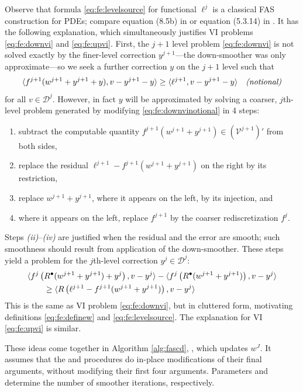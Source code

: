 \documentclass[letterpaper,final,12pt,reqno]{amsart}
\theoremstyle{cstyle}
\theoremstyle{cstyle*}
\theoremstyle{dstyle}
\numberwithin{equation}{section}
\numberwithin{figure}{section}
\numberwithin{table}{section}
\numberwithin{theorem}{section}
\newcommand{\ip}[2]{\langle#1,#2\rangle}
\newcommand{\iR}{R^{\bullet}}
\begin{document}
Observe that formula \eqref{eq:fe:levelsource} for functional $\ell^j$ is a classical FAS construction for PDEs; compare equation (8.5b) in \cite{BrandtLivne2011} or equation (5.3.14) in \cite{Trottenbergetal2001}.  It has the following explanation, which simultaneously justifies VI problems \eqref{eq:fe:downvi} and \eqref{eq:fe:upvi}.  First, the $j+1$ level problem \eqref{eq:fe:downvi} is not solved exactly by the finer-level correction $y^{j+1}$---the down-smoother was only approximate---so we seek a further correction $y$ on the $j+1$ level such that
\begin{equation}
\ip{f^{j+1}(w^{j+1}+y^{j+1}+y)}{v-y^{j+1}-y} \ge \ip{\ell^{j+1}}{v-y^{j+1}-y} \quad \text{\emph{(notional)}} \label{eq:fe:downvinotional}
\end{equation}
for all $v\in \mathcal{D}^j$.  However, in fact $y$ will be approximated by solving a coarser, $j$th-level problem generated by modifying \eqref{eq:fe:downvinotional} in 4 steps:
\begin{enumerate}
\item subtract the computable quantity $f^{j+1}(w^{j+1}+y^{j+1}) \in (\mathcal{V}^{j+1})'$ from both sides,
\item replace the residual $\ell^{j+1}-f^{j+1}(w^{j+1}+y^{j+1})$ on the right by its restriction,
\item replace $w^{j+1}+y^{j+1}$, where it appears on the left, by its injection, and
\item where it appears on the left, replace $f^{j+1}$ by the coarser rediscretization $f^j$.
\end{enumerate}
Steps \emph{(ii)}--\emph{(iv)} are justified when the residual and the error are smooth; such smoothness should result from application of the down-smoother.  These steps yield a problem for the $j$th-level correction $y^j \in \mathcal{D}^j$:
\begin{align}
&\ip{f^j\left(\iR(w^{j+1}+y^{j+1})+y^j\right)}{v-y^j} - \ip{f^j\left(\iR(w^{j+1}+y^{j+1})\right)}{v-y^j} \label{eq:fe:downvicluttered} \\
&\qquad \ge \ip{R\left(\ell^{j+1}-f^{j+1}(w^{j+1}+y^{j+1})\right)}{v-y^j} \notag
\end{align}
This is the same as VI problem \eqref{eq:fe:downvi}, but in cluttered form, motivating definitions \eqref{eq:fe:definew} and \eqref{eq:fe:levelsource}.  The explanation for VI \eqref{eq:fe:upvi} is similar.

These ideas come together in Algorithm \ref{alg:fascd}, , which updates $w^J$.  It assumes that the  and  procedures do in-place modifications of their final arguments, without modifying their first four arguments.  Parameters  and  determine the number of smoother iterations, respectively.
\end{document}
